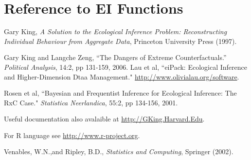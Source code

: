 \documentclass[11pt,oneside,letterpaper,titlepage]{article}
\begin{document}
\clearpage
\section{Reference to EI Functions}






\label{bib}
\begin{thebibliography}{6}

Gary King, \emph{A Solution to the Ecological Inference Problem: 
Reconstructing Individual Behaviour from Aggregate Data}, Princeton University Press (1997).

 Gary King and Langche Zeng, ``The Dangers of Extreme Counterfactuals.'' \emph{Political Analysis}, 14:2, pp 131-159, 2006.
 Lau et al, ``eiPack: Ecological Inference and Higher-Dimension Dtaa Management." \url{http://www.olivialau.org/software}.

 Rosen et al, ``Bayesian and Frequentist Inference for Ecological Inference: The RxC Case." \emph{Statistica Neerlandica}, 55:2, pp 134-156, 2001.

Useful documentation also avalaible at \url{http://GKing.Harvard.Edu}.

For R language see \url{http://www.r-project.org}.

Venables, W.N.,and Ripley, B.D., \emph{Statistics and Computing}, Springer (2002).

\end{thebibliography}
\end{document}
